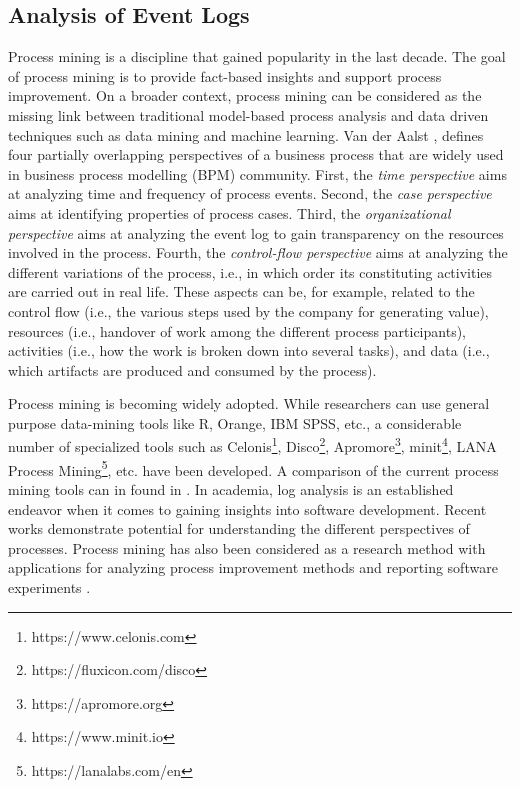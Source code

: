 \subsection{Analysis of Event Logs}

Process mining is a discipline that gained popularity in the last decade. The goal of process mining is to provide fact-based insights and support process improvement. On a broader context, process mining can be considered as the missing link between traditional model-based process analysis and data driven techniques such as data mining and machine learning. Van der Aalst \citep{DBLP:books/sp/Aalst16}, defines four partially overlapping perspectives of a business process that are widely used in business process modelling (BPM) community. First, the \emph{time perspective} aims at analyzing time and frequency of process events. Second, the \emph{case perspective} aims at identifying properties of process cases. Third, the \emph{organizational perspective} aims at analyzing the event log to gain transparency on the resources involved in the process. Fourth, the \emph{control-flow perspective} aims at analyzing the different variations of the process, i.e., in which order its constituting activities are carried out in real life. These aspects can be, for example, related to the control flow (i.e., the various steps used by the company for generating value), resources (i.e., handover of work among the different process participants), activities (i.e., how the work is broken down into several tasks), and data (i.e., which artifacts are produced and consumed by the process). 

Process mining is becoming widely adopted. While researchers can use general purpose data-mining tools like R, Orange, IBM SPSS, etc., a considerable number of specialized tools such as Celonis\footnote{https://www.celonis.com}, Disco\footnote{https://fluxicon.com/disco}, Apromore\footnote{https://apromore.org}, minit\footnote{https://www.minit.io}, LANA Process Mining\footnote{https://lanalabs.com/en}, etc. have been developed. A comparison of the current process mining tools can in found in \cite{viner2021process}. In academia, log analysis is an established endeavor when it comes to gaining insights into software development. Recent works
\citep{DBLP:conf/wecwis/MarquesSF18,DBLP:conf/bpm/BalaCMRP15,DBLP:conf/bpm/BalaRGBMS17,Bala2018b,DBLP:conf/ifip8-1/BalaKM20} demonstrate potential for understanding the different perspectives of processes. Process mining has also been considered as a research method \citep{DBLP:conf/hicss/GrisoldWMB20}  with applications for analyzing process improvement methods \citep{DBLP:conf/hicss/GrossMM19} and reporting software experiments \citep{DBLP:journals/ese/RevoredoDM21}.


